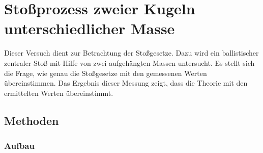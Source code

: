 \section{Stoßprozess zweier Kugeln unterschiedlicher Masse}
	
	Dieser Versuch dient zur Betrachtung der Stoßgesetze. Dazu wird ein ballistischer zentraler Stoß mit Hilfe von zwei aufgehängten Massen untersucht. Es stellt sich die Frage, wie genau die Stoßgesetze mit den gemessenen Werten übereinstimmen. Das Ergebnis dieser Messung zeigt, dass die Theorie mit den ermittelten Werten übereinstimmt. 
	
	\subsection{Methoden}
		
		\subsubsection{Aufbau}
			
